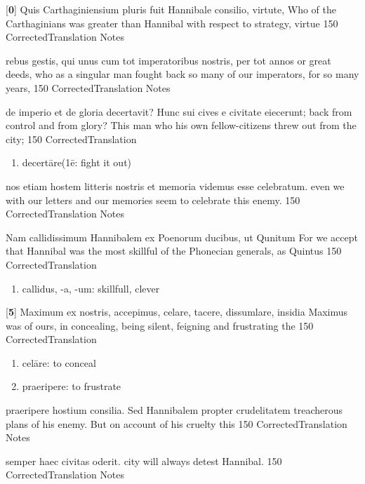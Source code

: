 \latline
  {[\textbf{0}] Quis Carthaginiensium pluris fuit Hannibale consilio, virtute,}
  { Who of the Carthaginians was greater than Hannibal with respect to strategy, virtue }
  {150}
  { CorrectedTranslation }
  { Notes }


\latline
  {rebus gestis, qui unus cum tot imperatoribus nostris, per tot annos}
  { or great deeds, who as a singular man fought back so many of our imperators, for so many years, }
  {150}
  { CorrectedTranslation }
  { Notes }


\latline
  {de imperio et de gloria decertavit?  Hunc sui cives e civitate eiecerunt;}
  { back from control and from glory?  This man who his own fellow-citizens threw out from the city; }
  {150}
  { CorrectedTranslation }
  { \begin{enumerate}
  	\item decert\={a}re(1\={e}:  fight it out)
  \end{enumerate} }


\latline
  {nos etiam hostem litteris nostris et memoria videmus esse celebratum.}
  { even we with our letters and our memories seem to celebrate this enemy. }
  {150}
  { CorrectedTranslation }
  { Notes }


\latline
  {Nam callidissimum Hannibalem ex Poenorum ducibus, ut Qunitum}
  { For we accept that Hannibal was the most skillful of the Phonecian generals, as Quintus }
  {150}
  { CorrectedTranslation }
  { \begin{enumerate}
  	\item callidus, -a, -um:  skillfull, clever
  \end{enumerate} }


\latline
  {[\textbf{5}] Maximum  ex nostris, accepimus, celare, tacere, dissumlare, insidia}
  { Maximus was of ours, in concealing, being silent, feigning and frustrating the }
  {150}
  { CorrectedTranslation }
  { \begin{enumerate}
  	\item cel\={a}re:  to conceal
  	\item praeripere:  to frustrate
  \end{enumerate} }


\latline
  {praeripere hostium consilia.  Sed Hannibalem propter crudelitatem }
  { treacherous plans of his enemy.  But on account of his cruelty this }
  {150}
  { CorrectedTranslation }
  { Notes }


\latline
  {semper haec civitas oderit.}
  { city will always detest Hannibal. }
  {150}
  { CorrectedTranslation }
  { Notes }


